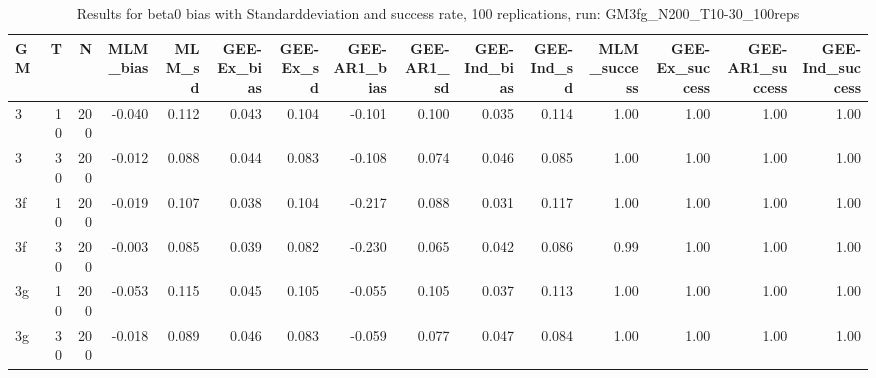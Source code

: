 \begin{table}[ht]
\centering
\begin{tabular}{lrrrrrrrrrrrrrr}
  \hline
GM & T & N & MLM\_bias & MLM\_sd & GEE-Ex\_bias & GEE-Ex\_sd & GEE-AR1\_bias & GEE-AR1\_sd & GEE-Ind\_bias & GEE-Ind\_sd & MLM\_success & GEE-Ex\_success & GEE-AR1\_success & GEE-Ind\_success \\ 
  \hline
3 & 10 & 200 & -0.040 & 0.112 & 0.043 & 0.104 & -0.101 & 0.100 & 0.035 & 0.114 & 1.00 & 1.00 & 1.00 & 1.00 \\ 
  3 & 30 & 200 & -0.012 & 0.088 & 0.044 & 0.083 & -0.108 & 0.074 & 0.046 & 0.085 & 1.00 & 1.00 & 1.00 & 1.00 \\ 
  3f & 10 & 200 & -0.019 & 0.107 & 0.038 & 0.104 & -0.217 & 0.088 & 0.031 & 0.117 & 1.00 & 1.00 & 1.00 & 1.00 \\ 
  3f & 30 & 200 & -0.003 & 0.085 & 0.039 & 0.082 & -0.230 & 0.065 & 0.042 & 0.086 & 0.99 & 1.00 & 1.00 & 1.00 \\ 
  3g & 10 & 200 & -0.053 & 0.115 & 0.045 & 0.105 & -0.055 & 0.105 & 0.037 & 0.113 & 1.00 & 1.00 & 1.00 & 1.00 \\ 
  3g & 30 & 200 & -0.018 & 0.089 & 0.046 & 0.083 & -0.059 & 0.077 & 0.047 & 0.084 & 1.00 & 1.00 & 1.00 & 1.00 \\ 
   \hline
\end{tabular}
\caption{Results for beta0 bias with Standarddeviation and success rate, 100 replications, run: GM3fg_N200_T10-30_100reps} 
\label{tab:beta0_bias_sd_success}
\end{table}
